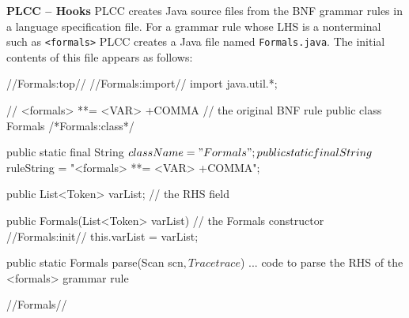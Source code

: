 \begin{minipage}[t]{\sw}
\slidenumber
\LARGE
{\bf PLCC -- Hooks}\exx
PLCC creates Java source files
from the BNF grammar rules in a language specification file.
For a grammar rule whose LHS is a nonterminal such as \verb'<formals>'
PLCC creates a Java file named \verb'Formals.java'.
The initial contents of this file appears as follows:
{\large
\begin{qv}
//Formals:top//
//Formals:import//
import java.util.*;

// <formals> **= <VAR> +COMMA // the original BNF rule 
public class Formals /*Formals:class*/ {

    public static final String $className = "Formals";
    public static final String $ruleString = "<formals> **= <VAR> +COMMA";

    public List<Token> varList; // the RHS field

    public Formals(List<Token> varList) { // the Formals constructor
//Formals:init//
        this.varList = varList;
    }

    public static Formals parse(Scan scn$, Trace trace$) {
        ... code to parse the RHS of the <formals> grammar rule
    }

//Formals//
}
\end{qv}
}
\end{minipage}
\clearpage
